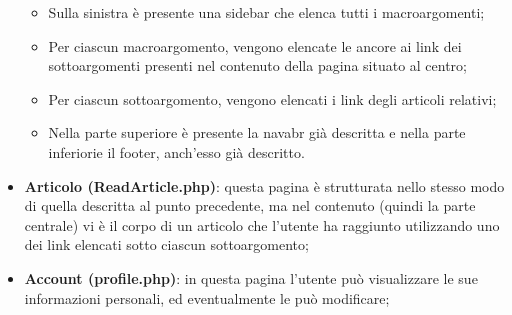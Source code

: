 \documentclass[12pt]{article}
\begin{document}
\begin{itemize}
				\begin{itemize}
					\item Sulla sinistra è presente una sidebar che elenca tutti i macroargomenti;
					\item Per ciascun macroargomento, vengono elencate le ancore ai link dei sottoargomenti presenti nel contenuto della pagina situato al centro;
					\item Per ciascun sottoargomento, vengono elencati i link degli articoli relativi;
					\item Nella parte superiore è presente la navabr già descritta e nella parte inferiorie il footer, anch'esso già descritto.
				\end{itemize}
			\item \textbf{Articolo (ReadArticle.php)}: questa pagina è strutturata nello stesso modo di quella descritta al punto precedente, ma nel contenuto (quindi la parte centrale) vi è il corpo di un articolo che l'utente ha raggiunto utilizzando uno dei link elencati sotto ciascun sottoargomento;
			\item \textbf{Account (profile.php)}: in questa pagina l'utente può visualizzare le sue informazioni personali, ed eventualmente le può modificare;
		\end{itemize}
	
\end{document}
